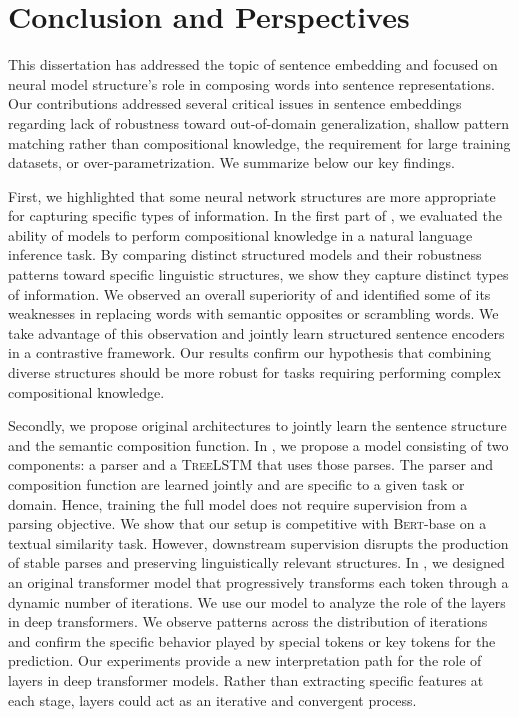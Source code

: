 \setchapterpreamble[u]{\margintoc}
\chapter{Conclusion and Perspectives}


This dissertation has addressed the topic of sentence embedding and focused on neural model structure's role in composing words into sentence representations. Our contributions addressed several critical issues in sentence embeddings regarding lack of robustness toward out-of-domain generalization, shallow pattern matching rather than compositional knowledge, the requirement for large training datasets, or over-parametrization. We summarize below our key findings.

First, we highlighted that some neural network structures are more appropriate for capturing specific types of information. In the first part of , we evaluated the ability of models to perform compositional knowledge in a natural language inference task. By comparing distinct structured models and their robustness patterns toward specific linguistic structures, we show they capture distinct types of information. We observed an overall superiority of \bert and identified some of its weaknesses in replacing words with semantic opposites or scrambling words. We take advantage of this observation and jointly learn structured sentence encoders in a contrastive framework. Our results confirm our hypothesis that combining diverse structures should be more robust for tasks requiring performing complex compositional knowledge.

Secondly, we propose original architectures to jointly learn the sentence structure and the semantic composition function. In , we propose a model consisting of two components: a parser and a \textsc{TreeLSTM} that uses those parses. The parser and composition function are learned jointly and are specific to a given task or domain. Hence, training the full model does not require supervision from a parsing objective. We show that our setup is competitive with \textsc{Bert}-base on a textual similarity task. However, downstream supervision disrupts the production of stable parses and preserving linguistically relevant structures. In , we designed an original transformer model that progressively transforms each token through a dynamic number of iterations. We use our model to analyze the role of the layers in deep transformers. We observe patterns across the distribution of iterations and confirm the specific behavior played by special tokens or key tokens for the prediction. Our experiments provide a new interpretation path for the role of layers in deep transformer models. Rather than extracting specific features at each stage, layers could act as an iterative and convergent process.

